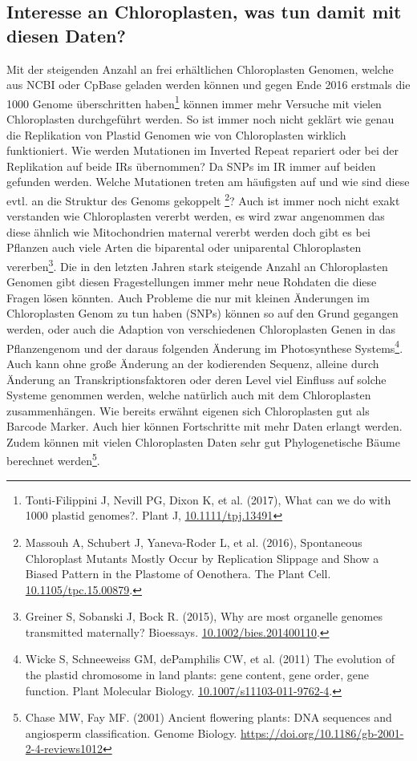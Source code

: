 \documentclass{scrartcl}
\begin{document}
\subsection{Interesse an Chloroplasten, was tun damit mit diesen Daten?}
\label{sec-2-6}
Mit der steigenden Anzahl an frei erhältlichen Chloroplasten Genomen, welche aus NCBI oder CpBase geladen werden können und gegen Ende 2016 erstmals die 1000 Genome überschritten haben\footnote{Tonti-Filippini J, Nevill PG, Dixon K, et al. (2017), What can we do with 1000 plastid genomes?. Plant J, \url{10.1111/tpj.13491}} können immer mehr Versuche mit vielen Chloroplasten durchgeführt werden.
So ist immer noch nicht geklärt wie genau die Replikation von Plastid Genomen wie von Chloroplasten wirklich funktioniert. Wie werden Mutationen im Inverted Repeat repariert oder bei der Replikation auf beide IRs übernommen?
Da SNPs im IR immer auf beiden gefunden werden. Welche Mutationen treten am häufigsten auf und wie sind diese evtl. an die Struktur des Genoms gekoppelt \footnote{Massouh A, Schubert J, Yaneva-Roder L, et al. (2016), Spontaneous Chloroplast Mutants Mostly Occur by Replication Slippage and Show a Biased Pattern in the Plastome of Oenothera. The Plant Cell. \url{10.1105/tpc.15.00879}.}? Auch ist immer noch nicht exakt verstanden wie Chloroplasten
vererbt werden, es wird zwar angenommen das diese ähnlich wie Mitochondrien maternal vererbt werden doch gibt es bei Pflanzen auch viele Arten die biparental oder uniparental Chloroplasten vererben\footnote{Greiner S, Sobanski J, Bock R. (2015), Why are most organelle genomes transmitted maternally? Bioessays. \url{10.1002/bies.201400110}.}. Die in den letzten 
Jahren stark steigende Anzahl an Chloroplasten Genomen gibt diesen Fragestellungen immer mehr neue Rohdaten die diese Fragen lösen könnten. Auch Probleme die nur mit kleinen Änderungen im Chloroplasten Genom zu tun 
haben (SNPs)
können so auf den Grund gegangen werden, oder auch die Adaption von verschiedenen Chloroplasten Genen in das Pflanzengenom und der daraus folgenden Änderung im Photosynthese Systems\footnote{Wicke S, Schneeweiss GM, dePamphilis CW, et al. (2011) The evolution of the plastid chromosome in land plants: gene content, gene order, gene function. Plant Molecular Biology.  \url{10.1007/s11103-011-9762-4}.}. Auch kann ohne große Änderung an der
kodierenden Sequenz, alleine durch Änderung an Transkriptionsfaktoren oder deren Level viel Einfluss auf solche Systeme genommen werden, welche natürlich auch mit dem Chloroplasten zusammenhängen\footnotemark[36]{}. Wie bereits erwähnt 
eigenen sich Chloroplasten gut als Barcode Marker. Auch hier können Fortschritte mit mehr Daten erlangt werden. Zudem können mit vielen Chloroplasten Daten sehr gut Phylogenetische Bäume berechnet werden\footnote{Chase MW, Fay MF. (2001) Ancient flowering plants: DNA sequences and angiosperm classification. Genome Biology. \url{https://doi.org/10.1186/gb-2001-2-4-reviews1012}}.
\end{document}
